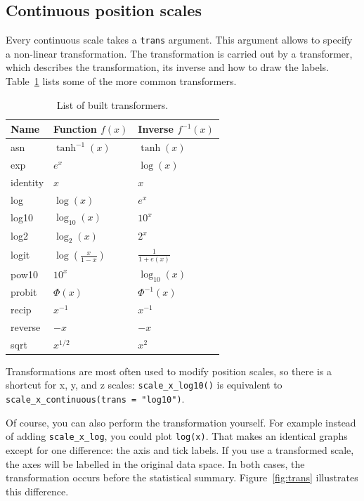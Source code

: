 \subsection{Continuous position scales}
\label{sub:scale_position}

Every continuous scale takes a {\tt trans} argument.  This argument allows to specify a non-linear transformation.  The transformation is carried out by a transformer, which describes the transformation, its inverse and how to draw the labels. Table~\ref{tbl:common-trans} lists some of the more common transformers. 

\begin{table}
  \centering
  \begin{tabular}{lll}
    \toprule
    Name & Function $f(x)$ & Inverse $f^{-1}(x)$ \\
    \midrule
    asn       & $\tanh^{-1}(x)$ & $\tanh(x)$ \\
    exp       & $e ^ x$         & $\log(x)$  \\
    identity  & $x$             & $x$        \\
    log       & $\log(x)$       & $e ^ x$    \\
    log10     & $\log_{10}(x)$  & $10 ^ x$   \\
    log2      & $\log_2(x)$     & $2 ^ x$    \\
    logit     & $\log(\frac{x}{1 - x})$ & $\frac{1}{1 + e(x)} $ \\
    pow10     & $10^x$          & $\log_{10}(x) $ \\
    probit    & $\Phi(x)$       & $\Phi^{-1}(x)$ \\
    recip     & $x^{-1}$        & $x^{-1}$ \\
    reverse   & $-x$            & $-x$     \\
    sqrt      & $x^{1/2}$       & $x ^ 2$  \\
    \bottomrule
  \end{tabular}
  \caption{List of built transformers.}
  \label{tbl:common-trans}
\end{table}

Transformations are most often used to modify position scales, so there is a shortcut for x, y, and z scales: \verb|scale_x_log10()| is equivalent to \verb|scale_x_continuous(trans = "log10")|.

Of course, you can also perform the transformation yourself.  For example instead of adding {\tt scale\_x\_log}, you could plot {\tt log(x)}.  That makes an identical graphs except for one difference: the axis and tick labels.  If you use a transformed scale, the axes will be labelled in the original data space. In both cases, the transformation occurs before the statistical summary. Figure~\ref{fig:trans} illustrates this difference.

